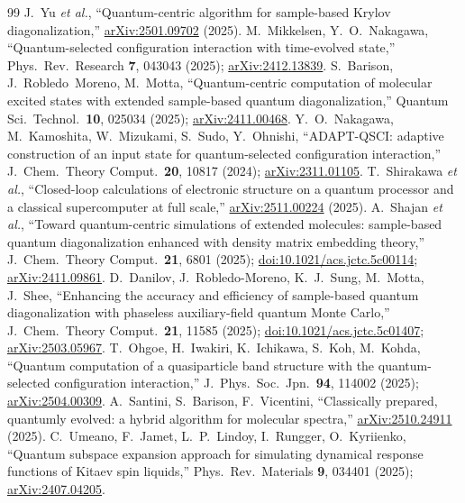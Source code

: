 \begin{thebibliography}{99}
 J.~Yu \emph{et al.}, ``Quantum-centric algorithm for sample-based Krylov diagonalization,'' \href{https://arxiv.org/abs/2501.09702}{arXiv:2501.09702} (2025).
 M.~Mikkelsen, Y.~O.~Nakagawa, ``Quantum-selected configuration interaction with time-evolved state,'' Phys.\ Rev.\ Research \textbf{7}, 043043 (2025); \href{https://arxiv.org/abs/2412.13839}{arXiv:2412.13839}.
 S.~Barison, J.~Robledo~Moreno, M.~Motta, ``Quantum-centric computation of molecular excited states with extended sample-based quantum diagonalization,'' Quantum Sci.\ Technol.\ \textbf{10}, 025034 (2025); \href{https://arxiv.org/abs/2411.00468}{arXiv:2411.00468}.
 Y.~O.~Nakagawa, M.~Kamoshita, W.~Mizukami, S.~Sudo, Y.~Ohnishi, ``ADAPT-QSCI: adaptive construction of an input state for quantum-selected configuration interaction,'' J.\ Chem.\ Theory Comput.\ \textbf{20}, 10817 (2024); \href{https://arxiv.org/abs/2311.01105}{arXiv:2311.01105}.
 T.~Shirakawa \emph{et al.}, ``Closed-loop calculations of electronic structure on a quantum processor and a classical supercomputer at full scale,'' \href{https://arxiv.org/abs/2511.00224}{arXiv:2511.00224} (2025).
 A.~Shajan \emph{et al.}, ``Toward quantum-centric simulations of extended molecules: sample-based quantum diagonalization enhanced with density matrix embedding theory,'' J.\ Chem.\ Theory Comput.\ \textbf{21}, 6801 (2025); \href{https://doi.org/10.1021/acs.jctc.5c00114}{doi:10.1021/acs.jctc.5c00114}; \href{https://arxiv.org/abs/2411.09861}{arXiv:2411.09861}.
 D.~Danilov, J.~Robledo-Moreno, K.~J.~Sung, M.~Motta, J.~Shee, ``Enhancing the accuracy and efficiency of sample-based quantum diagonalization with phaseless auxiliary-field quantum Monte Carlo,'' J.\ Chem.\ Theory Comput.\ \textbf{21}, 11585 (2025); \href{https://doi.org/10.1021/acs.jctc.5c01407}{doi:10.1021/acs.jctc.5c01407}; \href{https://arxiv.org/abs/2503.05967}{arXiv:2503.05967}.
 T.~Ohgoe, H.~Iwakiri, K.~Ichikawa, S.~Koh, M.~Kohda, ``Quantum computation of a quasiparticle band structure with the quantum-selected configuration interaction,'' J.\ Phys.\ Soc.\ Jpn.\ \textbf{94}, 114002 (2025); \href{https://arxiv.org/abs/2504.00309}{arXiv:2504.00309}.
 A.~Santini, S.~Barison, F.~Vicentini, ``Classically prepared, quantumly evolved: a hybrid algorithm for molecular spectra,'' \href{https://arxiv.org/abs/2510.24911}{arXiv:2510.24911} (2025).
 C.~Umeano, F.~Jamet, L.~P.~Lindoy, I.~Rungger, O.~Kyriienko, ``Quantum subspace expansion approach for simulating dynamical response functions of Kitaev spin liquids,'' Phys.\ Rev.\ Materials \textbf{9}, 034401 (2025); \href{https://arxiv.org/abs/2407.04205}{arXiv:2407.04205}.

\end{thebibliography}
